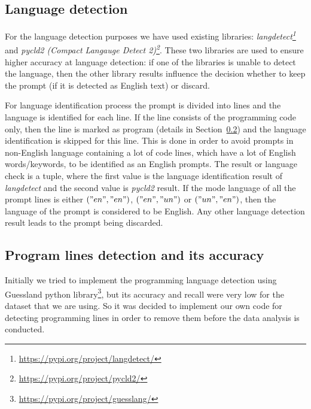\subsection{Language detection}
For the language detection purposes we have used existing libraries: \textit{langdetect\footnote{\url{https://pypi.org/project/langdetect/}}} and \textit{pycld2 (Compact Langauge Detect 2)\footnote{\url{https://pypi.org/project/pycld2/}}}. These two libraries are used to ensure higher accuracy at language detection: if one of the libraries is unable to detect the language, then the other library results influence the decision whether to keep the prompt (if it is detected as English text) or discard. 

For language identification process the prompt is divided into lines and the language is identified for each line. If the line consists of the programming code only, then the line is marked as program (details in Section~\ref{sec:prog-identification}) and the language identification is skipped for this line. This is done in order to avoid prompts in non-English language containing a lot of code lines, which have a lot of English words/keywords, to be identified as an English prompts. The result or language check is a tuple, where the first value is the language identification result of \textit{langdetect} and the second value is \textit{pycld2} result. If the mode language of all the prompt lines is either $("en", "en")$, $("en", "un")$ or $("un", "en")$, then the language of the prompt is considered to be English. Any other language detection result leads to the prompt being discarded. 

\subsection{Program lines detection and its accuracy} \label{sec:prog-identification}
Initially we tried to implement the programming language detection using Guessland python library\footnote{\url{https://pypi.org/project/guesslang/}}, but its accuracy and recall were very low for the dataset that we are using. So it was decided to implement our own code for detecting programming lines in order to remove them before the data analysis is conducted. 

